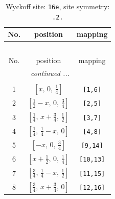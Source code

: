 \documentclass[fleqn,8pt]{jsarticle}
\begin{document}
\begin{longtable}{ccc}
\caption{Wyckoff site: {\tt 16e}, site symmetry: {\tt .2.}}
 \\
 \hline \hline
No. & position & mapping \\ \hline \endfirsthead

\multicolumn{2}{l}{\tablename\ \thetable{}} \\
 \hline \hline
No. & position & mapping \\ \hline \endhead

 \hline \hline
\multicolumn{2}{r}{\footnotesize\it continued ...} \\ \endfoot

 \hline \hline
\multicolumn{2}{r}{} \\ \endlastfoot

1 & $\left[ x,\, 0,\, \frac{1}{4} \right]$ & {\tt [1,6]} \\ \hline
2 & $\left[ \frac{1}{2} - x,\, 0,\, \frac{3}{4} \right]$ & {\tt [2,5]} \\ \hline
3 & $\left[ \frac{1}{4},\, x + \frac{3}{4},\, \frac{1}{2} \right]$ & {\tt [3,7]} \\ \hline
4 & $\left[ \frac{1}{4},\, \frac{1}{4} - x,\, 0 \right]$ & {\tt [4,8]} \\ \hline
5 & $\left[ - x,\, 0,\, \frac{3}{4} \right]$ & {\tt [9,14]} \\ \hline
6 & $\left[ x + \frac{1}{2},\, 0,\, \frac{1}{4} \right]$ & {\tt [10,13]} \\ \hline
7 & $\left[ \frac{3}{4},\, \frac{1}{4} - x,\, \frac{1}{2} \right]$ & {\tt [11,15]} \\ \hline
8 & $\left[ \frac{3}{4},\, x + \frac{3}{4},\, 0 \right]$ & {\tt [12,16]} \\
\end{longtable}
\renewcommand{\arraystretch}{1.2}
\end{document}

